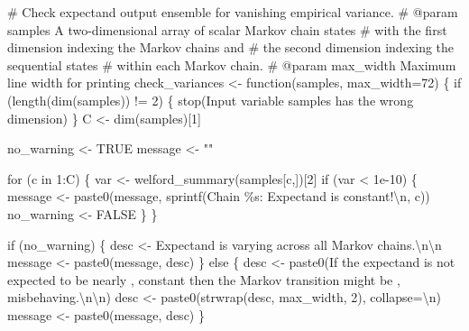 \documentclass[
  letterpaper,
  DIV=11,
  numbers=noendperiod]{scrartcl}
\newenvironment{Shaded}{\begin{snugshade}}{\end{snugshade}}
\newcommand{\CharTok}[1]{\textcolor[rgb]{0.13,0.47,0.30}{#1}}
\newcommand{\CommentTok}[1]{\textcolor[rgb]{0.37,0.37,0.37}{#1}}
\newcommand{\ControlFlowTok}[1]{\textcolor[rgb]{0.00,0.23,0.31}{#1}}
\newcommand{\DecValTok}[1]{\textcolor[rgb]{0.68,0.00,0.00}{#1}}
\newcommand{\FloatTok}[1]{\textcolor[rgb]{0.68,0.00,0.00}{#1}}
\newcommand{\KeywordTok}[1]{\textcolor[rgb]{0.00,0.23,0.31}{#1}}
\newcommand{\NormalTok}[1]{\textcolor[rgb]{0.00,0.23,0.31}{#1}}
\newcommand{\OperatorTok}[1]{\textcolor[rgb]{0.37,0.37,0.37}{#1}}
\newcommand{\SpecialCharTok}[1]{\textcolor[rgb]{0.37,0.37,0.37}{#1}}
\newcommand{\StringTok}[1]{\textcolor[rgb]{0.13,0.47,0.30}{#1}}
\begin{document}
\begin{Shaded}
\begin{Highlighting}[]
\CommentTok{\# Check expectand output ensemble for vanishing empirical variance.}
\CommentTok{\# @param samples A two{-}dimensional array of scalar Markov chain states }
\CommentTok{\#                with the first dimension indexing the Markov chains and }
\CommentTok{\#                the second dimension indexing the sequential states }
\CommentTok{\#                within each Markov chain.}
\CommentTok{\# @param max\_width Maximum line width for printing}
\NormalTok{check\_variances }\OperatorTok{\textless{}{-}}\NormalTok{ function(samples, max\_width}\OperatorTok{=}\DecValTok{72}\NormalTok{) \{}
  \ControlFlowTok{if}\NormalTok{ (length(dim(samples)) }\OperatorTok{!=} \DecValTok{2}\NormalTok{) \{}
\NormalTok{    stop(}\StringTok{\textquotesingle{}Input variable \textasciigrave{}samples\textasciigrave{} has the wrong dimension\textquotesingle{}}\NormalTok{)}
\NormalTok{  \}}
\NormalTok{  C }\OperatorTok{\textless{}{-}}\NormalTok{ dim(samples)[}\DecValTok{1}\NormalTok{]}
  
\NormalTok{  no\_warning }\OperatorTok{\textless{}{-}}\NormalTok{ TRUE}
\NormalTok{  message }\OperatorTok{\textless{}{-}} \StringTok{""}

  \ControlFlowTok{for}\NormalTok{ (c }\KeywordTok{in} \DecValTok{1}\NormalTok{:C) \{}
\NormalTok{    var }\OperatorTok{\textless{}{-}}\NormalTok{ welford\_summary(samples[c,])[}\DecValTok{2}\NormalTok{]}
    \ControlFlowTok{if}\NormalTok{ (var }\OperatorTok{\textless{}} \FloatTok{1e{-}10}\NormalTok{) \{}
\NormalTok{      message }\OperatorTok{\textless{}{-}}\NormalTok{ paste0(message,}
\NormalTok{                        sprintf(}\StringTok{\textquotesingle{}Chain }\SpecialCharTok{\%s}\StringTok{: Expectand is constant!}\CharTok{\textbackslash{}n}\StringTok{\textquotesingle{}}\NormalTok{, c))}
\NormalTok{      no\_warning }\OperatorTok{\textless{}{-}}\NormalTok{ FALSE}
\NormalTok{    \}}
\NormalTok{  \}}
  
  \ControlFlowTok{if}\NormalTok{ (no\_warning) \{}
\NormalTok{    desc }\OperatorTok{\textless{}{-}} \StringTok{\textquotesingle{}Expectand is varying across all Markov chains.}\CharTok{\textbackslash{}n\textbackslash{}n}\StringTok{\textquotesingle{}}
\NormalTok{    message }\OperatorTok{\textless{}{-}}\NormalTok{ paste0(message, desc)}
\NormalTok{  \} }\ControlFlowTok{else}\NormalTok{ \{}
\NormalTok{    desc }\OperatorTok{\textless{}{-}}\NormalTok{ paste0(}\StringTok{\textquotesingle{}If the expectand is not expected to be nearly \textquotesingle{}}\NormalTok{,}
                   \StringTok{\textquotesingle{}constant then the Markov transition might be \textquotesingle{}}\NormalTok{,}
                   \StringTok{\textquotesingle{}misbehaving.}\CharTok{\textbackslash{}n\textbackslash{}n}\StringTok{\textquotesingle{}}\NormalTok{)}
\NormalTok{    desc }\OperatorTok{\textless{}{-}}\NormalTok{ paste0(strwrap(desc, max\_width, }\DecValTok{2}\NormalTok{), collapse}\OperatorTok{=}\StringTok{\textquotesingle{}}\CharTok{\textbackslash{}n}\StringTok{\textquotesingle{}}\NormalTok{)}
\NormalTok{    message }\OperatorTok{\textless{}{-}}\NormalTok{ paste0(message, desc)}
\NormalTok{  \}}
  

\end{Highlighting}
\end{Shaded}
\end{document}
